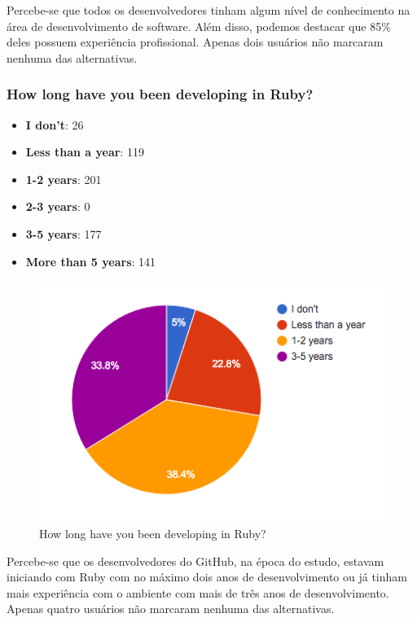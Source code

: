   Percebe-se que todos os desenvolvedores tinham algum nível de conhecimento na área de desenvolvimento de software. Além disso, podemos destacar que 85\% deles possuem experiência profissional. Apenas dois usuários não marcaram nenhuma das alternativas.
  
  \subsubsection{How long have you been developing in Ruby?}
  
  \begin{itemize}
    \item \textbf{I don't}: 26
    \item \textbf{Less than a year}: 119
    \item \textbf{1-2 years}: 201
    \item \textbf{2-3 years}: 0
    \item \textbf{3-5 years}: 177
    \item \textbf{More than 5 years}: 141
  \end{itemize}
  
  \begin{figure}[H]
	\centering
    \includegraphics[width=15cm]{Imagens/how-long.png}
    \caption{How long have you been developing in Ruby?}
  \end{figure}
  
  Percebe-se que os desenvolvedores do GitHub, na época do estudo, estavam iniciando com Ruby com no máximo dois anos de desenvolvimento ou já tinham mais experiência com o ambiente com mais de três anos de desenvolvimento. Apenas quatro usuários não marcaram nenhuma das alternativas.

